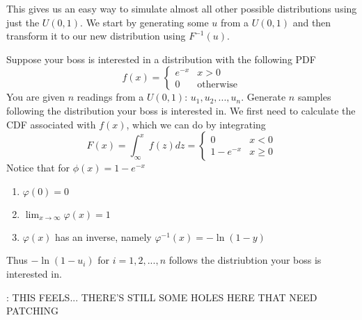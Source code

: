 This gives us an easy way to simulate almost all other possible distributions using just the $U(0,1)$. We start by generating some $u$ from a $U(0,1)$ and then transform it to our new distribution using $F^{-1}(u)$.
\begin{example}
    Suppose your boss is interested in a distribution with the following PDF
    \[
        f(x)=\begin{cases}
            e^{-x} & x> 0
            \\
            0 & \text{otherwise}
            \end{cases}
    \]
    You are given $n$ readings from a $U(0,1)$: $u_1, u_2,...,u_n$. Generate $n$ samples following the distribution your boss is interested in.
    \solution
    We first need to calculate the CDF associated with $f(x)$, which we can do by integrating
    \[
        F(x)=\int_{\infty}^x f(z)dz = \begin{cases}
            0 & x < 0
            \\
            1-e^{-x}& x\ge 0
        \end{cases}
    \]
    Notice that for $\phi(x)=1-e^{-x}$
    \begin{enumerate}
        \item $\varphi(0)=0$
        \item $\displaystyle\lim_{x\to\infty}\varphi(x)=1$
        \item $\varphi(x)$ has an inverse, namely $\varphi^{-1}(x)=-\ln(1-y)$
    \end{enumerate}
    Thus $-\ln(1-u_i)$ for $i=1,2,...,n$ follows the distriubtion your boss is interested in.
\end{example}
\todo: THIS FEELS... THERE'S STILL SOME HOLES HERE THAT NEED PATCHING

